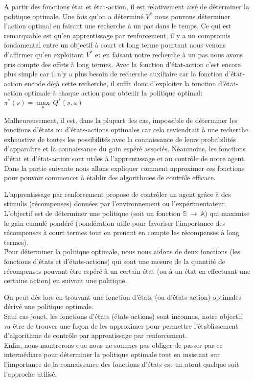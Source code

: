 A partir des fonctions état et état-action, il est relativement aisé de déterminer la politique optimale. Une fois qu'on a déterminé $V^*$ nous pouvons déterminer l'action optimal en faisant une recherche à un pas dans le temps. Ce qui est remarquable est qu'en apprentissage par renforcement, il y a un compromis fondamental entre un objectif à court et long terme pourtant nous venons d'affirmer qu'en exploitant $V^*$ et en faisant notre recherche à un pas nous avons pris compte des effets à long termes. Avec la fonction d'état-action c'est encore plus simple car il n'y a plus besoin de recherche auxiliaire car la fonction d'état-action encode déjà cette recherche, il suffit donc d'exploiter la fonction d'état-action optimale à chaque action pour obtenir la politique optimal: $\pi^*(s) = \underset{a}{\max}\:Q^*(s,a)$ 

Malheureusement, il est, dans la plupart des cas, impossible de déterminer les fonctions d'états ou d'états-actions optimales car cela reviendrait à une recherche exhaustive de toutes les possibilités avec la connaissance de leurs probabilités d'apparaître et la connaissance du gain espéré associés. Néanmoins, les fonctions d'état et d'état-action sont utiles à l'apprentissage et au contrôle de notre agent. Dans la partie suivante nous allons expliquer comment approximer ces fonctions pour pouvoir commencer à établir des algorithmes de contrôle efficace.
\bigskip
\begin{tcolorbox}[colback=gray!5!white,colframe=red!65!white,title=L'apprentissage par renforcement en résumé, coltitle=black, fonttitle=\bfseries]

L'apprentissage par renforcement propose de contrôler un agent grâce à des stimulis (récompenses) données par l'environnement ou l'expérimentateur. \\

L'objectif est de déterminer une politique (soit un fonction $\mathbb{S} \: \rightarrow \: \mathbb{A}$) qui maximise le gain cumulé pondéré (pondération utile pour favoriser l'importance des récompenses à court termes tout en prenant en compte les récompenses à long termes).\\ 


Pour déterminer la politique optimale, nous nous aidons de deux fonctions (les fonctions d'états et d'états-actions) qui sont une mesure de la quantité de récompenses pouvant être espéré à un certain état (ou à un état en effectuant une certaine action) en suivant une politique. 

On peut dès lors en trouvant une fonction d'états (ou d'états-action) optimales dérivé une politique optimale. \\

Sauf cas jouet, les fonctions d'états (états-actions) sont inconnus, notre objectif va être de trouver une façon de les approximer pour permettre l'établissement d'algorithme de contrôle par apprentissage par renforcement.\\


Enfin, nous montrerons que nous ne sommes pas obliger de passer par ce intermédiare pour déterminer la politique optimale tout en insistant sur l'importance de la connaissance des fonctions d'états est un atout quelque soit l'approche utilisé.
\end{tcolorbox}
